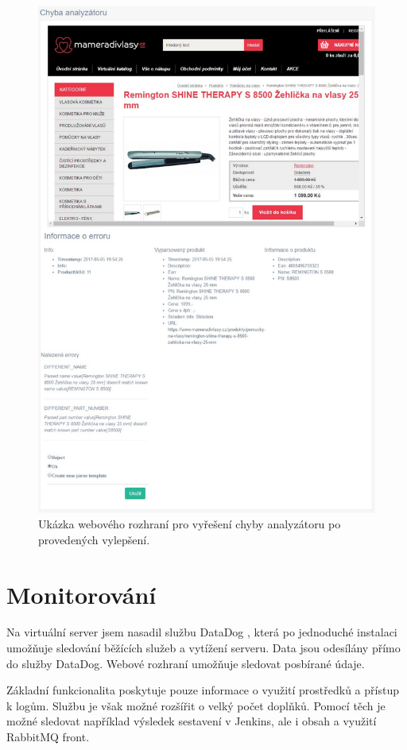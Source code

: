 \documentclass[thesis=B,czech]{FITthesis}[2012/06/26]
\begin{document}
\begin{figure}\centering
 	\includegraphics[width=1.0\textwidth]{resources/analyser-err}
	\caption[Webové rozhraní pro vyřešení chyby analyzátoru po provedení vylepšení]{Ukázka webového rozhraní pro vyřešení chyby analyzátoru po provedených vylepšení.}\label{fig:analyser-error}
\end{figure}

\section{Monitorování}
Na virtuální server jsem nasadil službu DataDog \cite{dataDog}, která po jednoduché instalaci umožňuje sledování běžících služeb
a vytížení serveru. Data jsou odesílány přímo do služby DataDog. Webové rozhraní umožňuje sledovat posbírané údaje.
\par
Základní funkcionalita poskytuje pouze informace o využití prostředků a přístup k logům. Službu je však možné rozšířit o velký počet doplňků. Pomocí těch je možné sledovat například výsledek sestavení v Jenkins, ale i obsah a využití RabbitMQ front.
\end{document}
